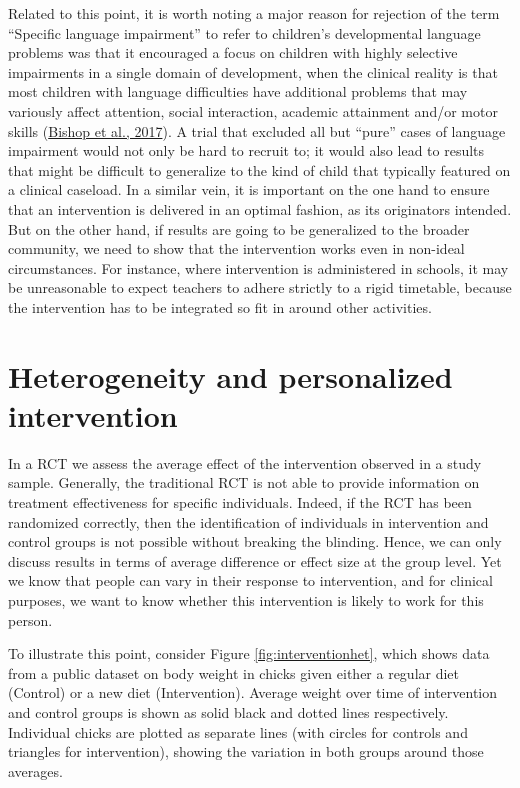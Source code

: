 \documentclass{krantz}
\begin{document}
Related to this point, it is worth noting a major reason for rejection of the term ``Specific language impairment'' to refer to children's developmental language problems was that it encouraged a focus on children with highly selective impairments in a single domain of development, when the clinical reality is that most children with language difficulties have additional problems that may variously affect attention, social interaction, academic attainment and/or motor skills (\protect\hyperlink{ref-bishop2017}{Bishop et al., 2017}). A trial that excluded all but ``pure'' cases of language impairment would not only be hard to recruit to; it would also lead to results that might be difficult to generalize to the kind of child that typically featured on a clinical caseload. In a similar vein, it is important on the one hand to ensure that an intervention is delivered in an optimal fashion, as its originators intended. But on the other hand, if results are going to be generalized to the broader community, we need to show that the intervention works even in non-ideal circumstances. For instance, where intervention is administered in schools, it may be unreasonable to expect teachers to adhere strictly to a rigid timetable, because the intervention has to be integrated so fit in around other activities.

\hypertarget{heterogeneity-and-personalized-intervention}{%
\section{Heterogeneity and personalized intervention}\label{heterogeneity-and-personalized-intervention}}

In a RCT we assess the average effect of the intervention observed in a study sample. Generally, the traditional RCT is not able to provide information on treatment effectiveness for specific individuals. Indeed, if the RCT has been randomized correctly, then the identification of individuals in intervention and control groups is not possible without breaking the blinding. Hence, we can only discuss results in terms of average difference or effect size at the group level. Yet we know that people can vary in their response to intervention, and for clinical purposes, we want to know whether this intervention is likely to work for this person.

To illustrate this point, consider Figure \ref{fig:interventionhet}, which shows data from a public dataset on body weight in chicks given either a regular diet (Control) or a new diet (Intervention). Average weight over time of intervention and control groups is shown as solid black and dotted lines respectively. Individual chicks are plotted as separate lines (with circles for controls and triangles for intervention), showing the variation in both groups around those averages.
\end{document}
